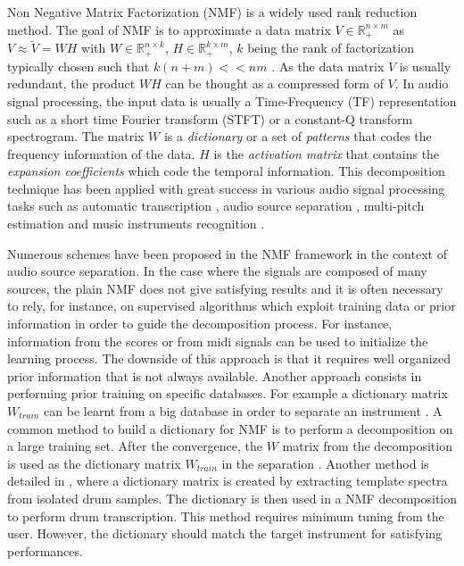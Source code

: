 \documentclass[journal]{IEEEtran}
\begin{document}
Non Negative Matrix Factorization (NMF) is a widely used rank reduction method. The goal of NMF is to approximate a data matrix $V \in \mathbb{R}_{+}^{n \times m} $ as $V \approx \tilde{V} = WH$ with $W \in \mathbb{R}_{+}^{n \times k}$, $H \in \mathbb{R}_{+}^{k \times m}$, $k$ being the rank of factorization typically chosen such that \mbox{$k(n+m) << nm  $} \cite{lee99}. As the data matrix $V$ is usually redundant, the product $WH$ can be thought as a compressed form of $V$. In audio signal processing, the input data is usually a Time-Frequency (TF) representation such as a short time Fourier transform (STFT) or a constant-Q transform spectrogram. The matrix $W$ is a {\em dictionary} or a set of {\em patterns} that codes the frequency information of the data. $H$ is the {\em activation matrix} that contains the {\em expansion coefficients} which code the temporal information.
This decomposition technique has been applied with great success in various audio signal processing tasks such as automatic transcription \cite{EwertM12,NB:ICASSP-07}, audio source separation \cite{HennequinDAFx2010,JLD:TASLP10}, multi-pitch estimation \cite{raczynski2007multipitch} and music instruments recognition \cite{cichocki2009nonnegative}.

Numerous schemes have been proposed in the NMF framework in the context of audio source separation. In the case where the signals are composed of many sources, the plain NMF does not give satisfying results and it is often necessary to rely, for instance, on supervised algorithms which exploit training data or prior information in order to guide the decomposition process. For instance, information from the scores or from midi signals \cite{EwertM12} can be used to initialize the learning process. The downside of this approach is that it requires well organized prior information that is not always available. Another approach consists in performing prior training on specific databases. For example a dictionary matrix $W_{train}$ can be learnt from a big database in order to separate an instrument \cite{jaureguiberry2011adaptation,wudrum}. A common method to build a dictionary for NMF is to perform a decomposition on a large training set. After the convergence, the $W$ matrix from the decomposition is used as the dictionary matrix $W_{train}$ in the separation \cite{jaureguiberry2011adaptation}. Another method is detailed in \cite{wudrum}, where a dictionary matrix is created by extracting template spectra from isolated drum samples. The dictionary is then used in a NMF decomposition to perform drum transcription. This method requires minimum tuning from the user. However, the dictionary should match the target instrument for satisfying performances. 
\end{document}

